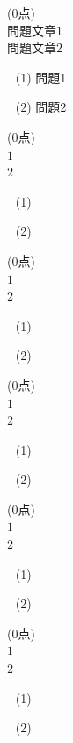 \documentclass[a4paper]{ltjsarticle}
\begin{document}



\fontsize{14truept}{14truept}\selectfont

\white\white{}\noindent
{}　\;(0点)
\\[5mm]\indent
　$問題文章1$\\[2mm]
　$問題文章2$\\[1mm]
\begin{enumerate}
\item[　(1)] \spw 問題1
\item[　(2)] \spw 問題2
\end{enumerate}


\newpage\noindent
{}　\;(0点)
\\[5mm]\indent
　$1$\\[2mm]
　$2$\\[1mm]
\begin{enumerate}
\item[　(1)] 
\item[　(2)] 
\end{enumerate}


\newpage\noindent
{}　\;(0点)
\\[5mm]\indent
　$1$\\[2mm]
　$2$\\[1mm]
\begin{enumerate}
\item[　(1)] 
\item[　(2)] 
\end{enumerate}


\newpage\noindent
{}　\;(0点)
\\[5mm]\indent
　$1$\\[2mm]
　$2$\\[1mm]
\begin{enumerate}
\item[　(1)] 
\item[　(2)] 
\end{enumerate}


\newpage\noindent
{}　\;(0点)
\\[5mm]\indent
　$1$\\[2mm]
　$2$\\[1mm]
\begin{enumerate}
\item[　(1)] 
\item[　(2)] 
\end{enumerate}


\newpage\noindent
{}　\;(0点)
\\[5mm]\indent
　$1$\\[2mm]
　$2$\\[1mm]
\begin{enumerate}
\item[　(1)] 
\item[　(2)] 
\end{enumerate}

\vfill{}\leavevmode\\[6mm]
\white\white
%
\end{document}
